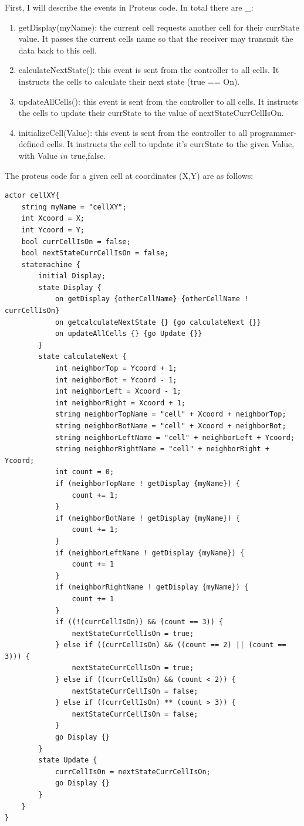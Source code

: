 First, I will describe the events in Proteus code.
In total there are _:
\begin{enumerate}
    \item getDisplay(myName): the current cell requests another cell for their currState value.
    It passes the current cells name so that the receiver may transmit the data back to this cell.
    \item calculateNextState(): this event is sent from the controller to all cells.
    It instructs the cells to calculate their next state (true == On).
    \item updateAllCells(): this event is sent from the controller to all cells.
    It instructs the cells to update their currState to the value of nextStateCurrCellIsOn.
    \item initializeCell(Value): this event is sent from the controller to all programmer-defined cells.
    It instructs the cell to update it's currState to the given Value, with Value $in$ {true,false}.
\end{enumerate}

The proteus code for a given cell at coordinates (X,Y) are as follows:

\begin{verbatim}
actor cellXY{
    string myName = "cellXY";
    int Xcoord = X;
    int Ycoord = Y;
    bool currCellIsOn = false;
    bool nextStateCurrCellIsOn = false;
    statemachine {
        initial Display;
        state Display {
            on getDisplay {otherCellName} {otherCellName ! currCellIsOn}
            on getcalculateNextState {} {go calculateNext {}}
            on updateAllCells {} {go Update {}}
        }
        state calculateNext {
            int neighborTop = Ycoord + 1;
            int neighborBot = Ycoord - 1;
            int neighborLeft = Xcoord - 1;
            int neighborRight = Xcoord + 1;
            string neighborTopName = "cell" + Xcoord + neighborTop;
            string neighborBotName = "cell" + Xcoord + neighborBot;
            string neighborLeftName = "cell" + neighborLeft + Ycoord;
            string neighborRightName = "cell" + neighborRight + Ycoord;
            int count = 0;
            if (neighborTopName ! getDisplay {myName}) {
                count += 1;
            }
            if (neighborBotName ! getDisplay {myName}) {
                count += 1;
            }
            if (neighborLeftName ! getDisplay {myName}) {
                count += 1
            }
            if (neighborRightName ! getDisplay {myName}) {
                count += 1
            }
            if ((!(currCellIsOn)) && (count == 3)) {
                nextStateCurrCellIsOn = true;
            } else if ((currCellIsOn) && ((count == 2) || (count == 3))) {
                nextStateCurrCellIsOn = true;
            } else if ((currCellIsOn) && (count < 2)) {
                nextStateCurrCellIsOn = false;
            } else if ((currCellIsOn) ** (count > 3)) {
                nextStateCurrCellIsOn = false;
            }
            go Display {}
        }
        state Update {
            currCellIsOn = nextStateCurrCellIsOn;
            go Display {}
        }
    }
}
\end{verbatim}

